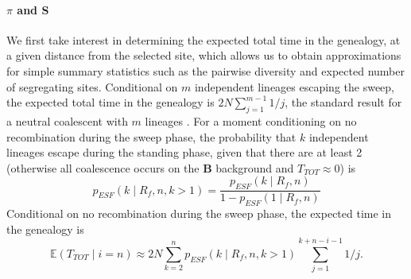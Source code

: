 \documentclass[a4paper,10pt]{article}
\begin{document}
\paragraph{$\pi$ and S} We first take interest in determining the expected total time in the genealogy, at a given distance from the selected site, which allows us to obtain approximations for simple summary statistics such as the pairwise diversity and expected number of segregating sites. Conditional on $m$ independent lineages escaping the sweep, the expected total time in the genealogy is $2N \sum_{j=1}^{m-1} 1/j$, the standard result for a neutral coalescent with $m$ lineages \citep{Watterson:1975ur}. For a moment conditioning on no recombination during the sweep phase, the probability that $k$ independent lineages escape during the standing phase, given that there are at least 2 (otherwise all coalescence occurs on the $\textbf{B}$ background and $T_{TOT} \approx 0$) is 
\begin{equation}
	p_{ESF}\left(k \mid R_f , n , k > 1\right) = \frac{p_{ESF}\left(k \mid R_f , n \right)}{1 - p_{ESF}\left(1 \mid R_f , n \right)}
\end{equation}
Conditional on no recombination during the sweep phase, the expected time in the genealogy is
\begin{equation}
	\mathbb{E}\left(T_{TOT} \mid i = n \right)  \approx 2N \sum_{k=2}^n p_{ESF}(k\mid R_f,n, k>1)   \sum_{j=1}^{k+n-i-1} 1/j.
\end{equation}
\end{document}
